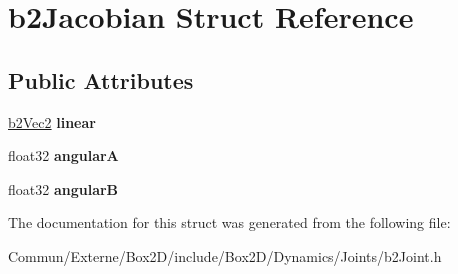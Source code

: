 \hypertarget{structb2_jacobian}{}\section{b2\+Jacobian Struct Reference}
\label{structb2_jacobian}
\subsection*{Public Attributes}
\begin{DoxyCompactItemize}
\item 
\hyperlink{structb2_vec2}{b2\+Vec2} {\bfseries linear}\hypertarget{structb2_jacobian_aa63199b443d411972b9cb6aac6c7cb34}{}\label{structb2_jacobian_aa63199b443d411972b9cb6aac6c7cb34}

\item 
float32 {\bfseries angularA}\hypertarget{structb2_jacobian_a0669f849afcdc154b36f86cb0529d2bc}{}\label{structb2_jacobian_a0669f849afcdc154b36f86cb0529d2bc}

\item 
float32 {\bfseries angularB}\hypertarget{structb2_jacobian_a3bbdbd8e46f4fa9be2e50434edaaeb14}{}\label{structb2_jacobian_a3bbdbd8e46f4fa9be2e50434edaaeb14}

\end{DoxyCompactItemize}


The documentation for this struct was generated from the following file\+:\begin{DoxyCompactItemize}
\item 
Commun/\+Externe/\+Box2\+D/include/\+Box2\+D/\+Dynamics/\+Joints/b2\+Joint.\+h\end{DoxyCompactItemize}
